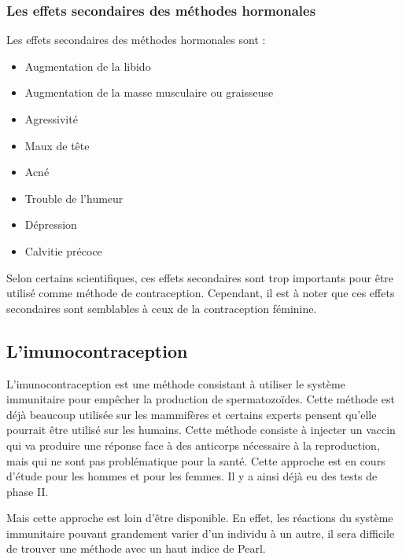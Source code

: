 \documentclass[12pt,a4paper]{report}
\begin{document}
\subsubsection{Les effets secondaires des méthodes hormonales}

Les effets secondaires des méthodes hormonales sont :
\begin{itemize}
    \item Augmentation de la libido
    \item Augmentation de la masse musculaire ou graisseuse
    \item Agressivité
    \item Maux de tête
    \item Acné
    \item Trouble de l'humeur
    \item Dépression
    \item Calvitie précoce \cites{guillaumedaudinContraceptesEnqueteDernier2022}{anne-sophiedelcourHommeSousPilule}{ContraceptionHormonaleMasculine2016}
\end{itemize}

Selon certains scientifiques, ces effets secondaires sont trop importants pour être utilisé comme méthode de contraception. Cependant, il est à noter que ces effets secondaires sont semblables à ceux de la contraception féminine. \cite{ContraceptionHormonaleMasculine2016}

\subsection{L'imunocontraception}

L'imunocontraception est une méthode consistant à utiliser le système immunitaire pour empêcher la production de spermatozoïdes.
Cette méthode est déjà beaucoup utilisée sur les mammifères et certains experts pensent qu'elle pourrait être utilisé sur les humains. \cite{ImmunocontraceptionWikipedia}
Cette méthode consiste à injecter un vaccin qui va produire une réponse face à des anticorps nécessaire à la reproduction, mais qui ne sont pas problématique pour la santé.
Cette approche est en cours d'étude pour les hommes et pour les femmes. Il y a ainsi déjà eu des tests de phase II. \cite{mclaughlinThereRoleImmunocontraception2011}

Mais cette approche est loin d'être disponible. En effet, les réactions du système immunitaire pouvant grandement varier d'un individu à un autre, il sera difficile de trouver une méthode avec un haut indice de Pearl. \cite{mclaughlinThereRoleImmunocontraception2011}
\end{document}
